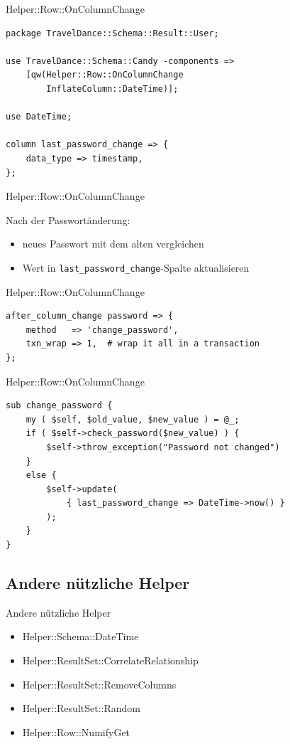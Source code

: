 \begin{frame}[fragile]{Helper::Row::OnColumnChange}

\begin{lstlisting}
package TravelDance::Schema::Result::User;

use TravelDance::Schema::Candy -components =>
    [qw(Helper::Row::OnColumnChange 
        InflateColumn::DateTime)];

use DateTime;

column last_password_change => {
    data_type => timestamp,
};
\end{lstlisting}
\end{frame}

\begin{frame}[fragile]{Helper::Row::OnColumnChange}

Nach der Passwortänderung:

\begin{itemize}
\item neues Passwort mit dem alten vergleichen
\item Wert in \verb|last_password_change|-Spalte aktualisieren
\end{itemize}

\end{frame}

\begin{frame}[fragile]{Helper::Row::OnColumnChange}
\begin{lstlisting}
after_column_change password => {
    method   => 'change_password',
    txn_wrap => 1,  # wrap it all in a transaction
};
\end{lstlisting}
\end{frame}

\begin{frame}[fragile]{Helper::Row::OnColumnChange}
\begin{lstlisting}
sub change_password {
    my ( $self, $old_value, $new_value ) = @_;
    if ( $self->check_password($new_value) ) {
        $self->throw_exception("Password not changed")
    }
    else {
        $self->update(
            { last_password_change => DateTime->now() }
        );
    }
}
\end{lstlisting}
\end{frame}

\subsection{Andere nützliche Helper}
\begin{frame}{Andere nützliche Helper}
\begin{itemize}
\item Helper::Schema::DateTime
\item Helper::ResultSet::CorrelateRelationship
\item Helper::ResultSet::RemoveColumns
\item Helper::ResultSet::Random
\item Helper::Row::NumifyGet
\end{itemize}
\end{frame}


